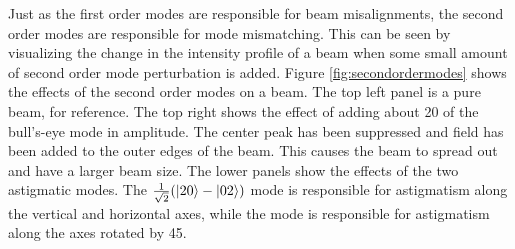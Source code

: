 Just as the first order modes are responsible for beam misalignments, the second order modes are responsible for mode mismatching. %
This can be seen by visualizing the change in the intensity profile of a beam when some small amount of second order mode perturbation is added. %
Figure \ref{fig:secondordermodes} shows the effects of the second order modes on a  beam. %
The top left panel is a pure  beam, for reference. %
The top right shows the effect of adding about 20\perc{} of the bull's-eye mode in amplitude. %
The center peak has been suppressed and field has been added to the outer edges of the beam. %
This causes the beam to spread out and have a larger beam size. %
The lower panels show the effects of the two astigmatic modes. %
The $\frac{1}{\sqrt{2}}(\left| 20 \right>-\left| 02 \right>)$ mode is responsible for astigmatism along the vertical and horizontal axes, while the  mode is responsible for astigmatism along the axes rotated by 45\degrees{}.
